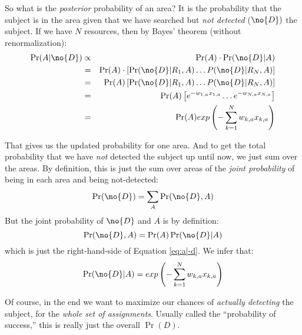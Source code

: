 \documentclass[10pt]{article}
\begin{document}
So what is the \emph{posterior} probability of an area? It is the
probability that the subject is in the area given that we have
searched but \emph{not detected} ($\no{D})$ the subject. If we have
$N$ resources, then by Bayes'
theorem (without renormalization):
\begin{eqnarray}
  \label{eq:a|-d}
  \Pr(A|\no{D}) &\propto& \Pr(A) \cdot \Pr(\no{D}|A)\\
  \nonumber     &=& \Pr(A) \cdot \left[\Pr(\no{D}|R_1,A) \ldots 
                   P(\no{D}|R_N,A)\right] \\
  \nonumber     &=& \Pr(A) \left[\Pr(\no{D}|R_1,A) \ldots
                   P(\no{D}|R_N,A)\right] \\
  \nonumber     &=& \Pr(A) \left[e^{-w_{1,a} x_{1,a}} \ldots
                   e^{-w_{N,a} x_{N,a}} \right]\\
  \nonumber     &=& \Pr(A) exp\left(-\sum_{k=1}^N w_{k,a} x_{k,a}\right)
\end{eqnarray} 

That gives us the updated probability for one area. And to get the
total probability that we have \emph{not} detected the subject up
until now, we just sum over the areas. By definition, this is just the
sum over areas of the \emph{joint probability} of being in each area
and being not-detected:
\begin{equation}
  \label{eq:6}
  \Pr(\no{D}) = \sum_A \Pr(\no{D},A)
\end{equation}
But the joint probability of $\no{D}$ and $A$ is by definition: 
\begin{equation}
  \label{eq:8}
  \Pr(\no{D},A) =  \Pr(A) \Pr(\no{D}|A)
\end{equation}
which is just the right-hand-side of Equation \ref{eq:a|-d}. We
infer that:
\begin{equation}
  \label{eq:-d|a}
  \Pr(\no{D}|A) = exp\left(-\sum_{k=1}^N w_{k,a} x_{k,a}\right)
\end{equation}

Of course, in the end we want to maximize our chances of \emph{actually
  detecting} the subject, for the \emph{whole set of
  assignments}. Usually called the ``probability of success,'' this is
really just the overall $\Pr(D)$.

\end{document}
